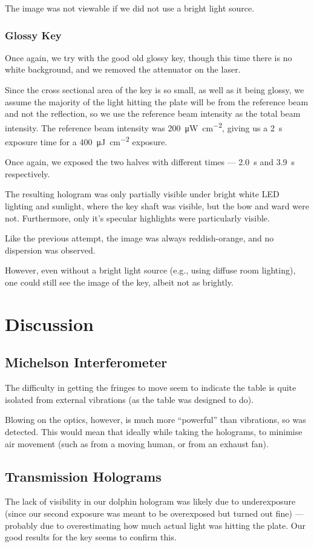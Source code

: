 \documentclass[a4paper]{scrartcl}
\begin{document}
The image was not viewable if we did not use a bright light source.

\subsubsection{Glossy Key}
Once again, we try with the good old glossy key, though this time there is no white background, and we removed the attenuator on the laser.

Since the cross sectional area of the key is so small, as well as it being glossy, we assume the majority of the light hitting the plate will be from the reference beam and not the reflection, so we use the reference beam intensity as the total beam intensity. The reference beam intensity was \SI{200}{\micro\watt\per\centi\metre\squared}, giving us a \SI{2}{\second} exposure time for a \SI{400}{\micro\joule\per\centi\metre\squared} exposure.

Once again, we exposed the two halves with different times --- \SI{2.0}{\second} and \SI{3.9}{\second} respectively.

The resulting hologram was only partially visible under bright white LED lighting and sunlight, where the key shaft was visible, but the bow and ward were not. Furthermore, only it's specular highlights were particularly visible.

Like the previous attempt, the image was always reddish-orange, and no dispersion was observed.

However, even without a bright light source (e.g., using diffuse room lighting), one could still see the image of the key, albeit not as brightly.

\section{Discussion}
\subsection{Michelson Interferometer}
The difficulty in getting the fringes to move seem to indicate the table is quite isolated from external vibrations (as the table was designed to do).

Blowing on the optics, however, is much more ``powerful'' than vibrations, so was detected. This would mean that ideally while taking the holograms, to minimise air movement (such as from a moving human, or from an exhaust fan).

\subsection{Transmission Holograms}
The lack of visibility in our dolphin hologram was likely due to underexposure (since our second exposure was meant to be overexposed but turned out fine) --- probably due to overestimating how much actual light was hitting the plate. Our good results for the key seems to confirm this.
\end{document}
